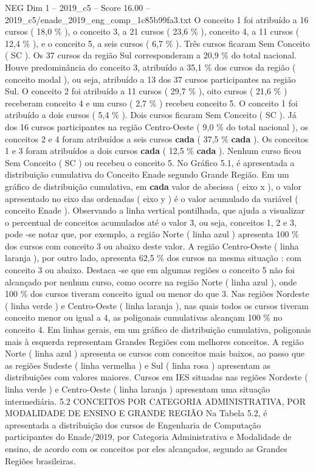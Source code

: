 \begin{textsample}{NEG Dim 1 – 2019\_c5 – Score 16.00 – 2019\_c5/enade\_2019\_eng\_comp\_1c85b99fa3.txt}
O conceito 1 foi atribuído a 16 cursos ( 18,0 \% ), o conceito 3, a 21 cursos ( 23,6 \% ), conceito 4, a 11 cursos ( 12,4 \% ), e o conceito 5, a seis cursos ( 6,7 \% ).
Três cursos ficaram Sem Conceito ( SC ).
Os 37 cursos da região Sul corresponderam a 20,9 \% do total nacional.
Houve predominância do conceito 3, atribuído a 35,1 \% dos cursos da região ( conceito modal ), ou seja, atribuído a 13 dos 37 cursos participantes na região Sul.
O conceito 2 foi atribuído a 11 cursos ( 29,7 \% ), oito cursos ( 21,6 \% ) receberam conceito 4 e um curso ( 2,7 \% ) recebeu conceito 5.
O conceito 1 foi atribuído a dois cursos ( 5,4 \% ).
Dois cursos ficaram Sem Conceito ( SC ).
Já dos 16 cursos participantes na região Centro-Oeste ( 9,0 \% do total nacional ), os conceitos 2 e 4 foram atribuídos a seis cursos \textbf{cada} ( 37,5 \% \textbf{cada} ).
Os conceitos 1 e 3 foram atribuídos a dois cursos \textbf{cada} ( 12,5 \% \textbf{cada} ).
Nenhum curso ficou Sem Conceito ( SC ) ou recebeu o conceito 5.
No Gráfico 5.1, é apresentada a distribuição cumulativa do Conceito Enade segundo Grande Região.
Em um gráfico de distribuição cumulativa, em \textbf{cada} valor de abscissa ( eixo x ), o valor apresentado no eixo das ordenadas ( eixo y ) é o valor acumulado da variável ( conceito Enade ).
Observando a linha vertical pontilhada, que ajuda a visualizar o percentual de conceitos acumulados até o valor 3, ou seja, conceitos 1, 2 e 3, pode -se notar que, por exemplo, a região Norte ( linha azul ) apresenta 100 \% dos cursos com conceito 3 ou abaixo deste valor.
A região Centro-Oeste ( linha laranja ), por outro lado, apresenta 62,5 \% dos cursos na mesma situação : com conceito 3 ou abaixo.
Destaca -se que em algumas regiões o conceito 5 não foi alcançado por nenhum curso, como ocorre na região Norte ( linha azul ), onde 100 \% dos cursos tiveram conceito igual ou menor do que 3.
Nas regiões Nordeste ( linha verde ) e Centro-Oeste ( linha laranja ), nas quais todos os cursos tiveram conceito menor ou igual a 4, as poligonais cumulativas alcançam 100 \% no conceito 4.
Em linhas gerais, em um gráfico de distribuição cumulativa, poligonais mais à esquerda representam Grandes Regiões com melhores conceitos.
A região Norte ( linha azul ) apresenta os cursos com conceitos mais baixos, ao passo que as regiões Sudeste ( linha vermelha ) e Sul ( linha rosa ) apresentam as distribuições com valores maiores.
Cursos em IES situadas nas regiões Nordeste ( linha verde ) e Centro-Oeste ( linha laranja ) apresentam uma situação intermediária. 5.2 CONCEITOS POR CATEGORIA ADMINISTRATIVA, POR MODALIDADE DE ENSINO E GRANDE REGIÃO Na Tabela 5.2, é apresentada a distribuição dos cursos de Engenharia de Computação participantes do Enade/2019, por Categoria Administrativa e Modalidade de ensino, de acordo com os conceitos por eles alcançados, segundo as Grandes Regiões brasileiras.

\end{textsample}
